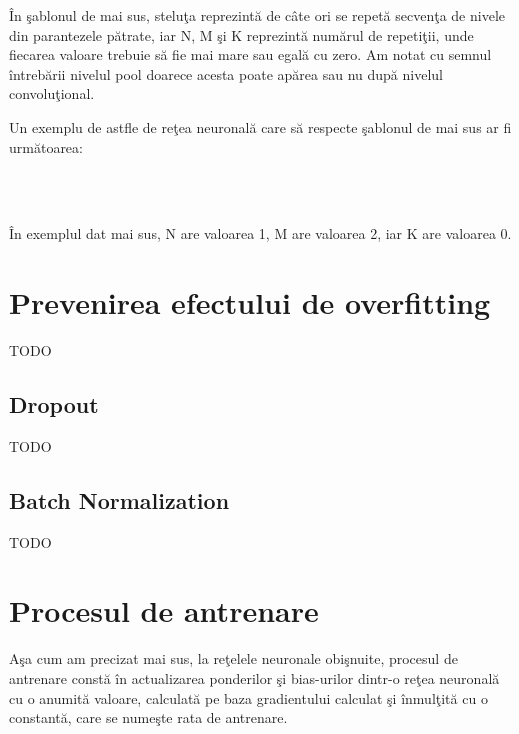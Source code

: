 \^{I}n \c{s}ablonul de mai sus, stelu\c{t}a reprezint\u{a} de c\^{a}te ori se repet\u{a} secven\c{t}a de nivele din parantezele p\u{a}trate, iar N, M \c{s}i K reprezint\u{a} num\u{a}rul de repeti\c{t}ii, unde fiecarea valoare trebuie s\u{a} fie mai mare sau egal\u{a} cu zero. Am notat cu semnul \^{i}ntreb\u{a}rii nivelul pool doarece acesta poate ap\u{a}rea sau nu dup\u{a} nivelul convolu\c{t}ional.

\par

Un exemplu de astfle de re\c{t}ea neuronal\u{a} care s\u{a} respecte \c{s}ablonul de mai sus ar fi urm\u{a}toarea:

 \longrightarrow {} \longrightarrow {} \longrightarrow {} \longrightarrow \\ 
\longrightarrow {} \longrightarrow {} \longrightarrow {} \longrightarrow \\ 
\longrightarrow  {} \longrightarrow {}

\^{I}n exemplul dat mai sus, N are valoarea 1, M are valoarea 2, iar K are valoarea 0.

\section{Prevenirea efectului de overfitting}

TODO

\subsection{Dropout}

TODO

\subsection{Batch Normalization}

TODO

\section{Procesul de antrenare}

A\c{s}a cum am precizat mai sus, la re\c{t}elele neuronale obi\c{s}nuite, procesul de antrenare const\u{a} \^{i}n actualizarea ponderilor \c{s}i bias-urilor dintr-o re\c{t}ea neuronal\u{a} cu o anumit\u{a} valoare, calculat\u{a} pe baza gradientului calculat \c{s}i \^{i}nmul\c{t}it\u{a} cu o constant\u{a}, care se nume\c{s}te rata de antrenare.

